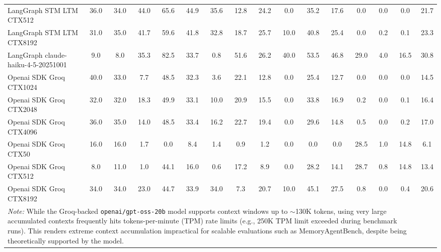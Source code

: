 \begin{table}[t]
\begin{tabular}{
    l|
    *{5}{c}|  %
    *{3}{c}|  %
    *{3}{c}|  %
    *{3}{c}|  %
    c         %
}
LangGraph STM LTM CTX512 & 36.0 & 34.0 & 44.0 & 65.6 & 44.9 & 35.6 & 12.8 & 24.2 & 0.0 & 35.2 & 17.6 & 0.0 & 0.0 & 0.0 & 21.7 \\
LangGraph STM LTM CTX8192 & 31.0 & 35.0 & 41.7 & 59.6 & 41.8 & 32.8 & 18.7 & 25.7 & 10.0 & 40.8 & 25.4 & 0.0 & 0.2 & 0.1 & 23.3 \\
LangGraph claude-haiku-4-5-20251001 & 9.0 & 8.0 & 35.3 & 82.5 & 33.7 & 0.8 & 51.6 & 26.2 & 40.0 & 53.5 & 46.8 & 29.0 & 4.0 & 16.5 & 30.8 \\
Openai SDK Groq CTX1024 & 40.0 & 33.0 & 7.7 & 48.5 & 32.3 & 3.6 & 22.1 & 12.8 & 0.0 & 25.4 & 12.7 & 0.0 & 0.0 & 0.0 & 14.5 \\
Openai SDK Groq CTX2048 & 32.0 & 32.0 & 18.3 & 49.9 & 33.1 & 10.0 & 20.9 & 15.5 & 0.0 & 33.8 & 16.9 & 0.2 & 0.0 & 0.1 & 16.4 \\
Openai SDK Groq CTX4096 & 36.0 & 35.0 & 14.0 & 48.5 & 33.4 & 16.2 & 22.7 & 19.4 & 0.0 & 29.6 & 14.8 & 0.5 & 0.0 & 0.2 & 17.0 \\
Openai SDK Groq CTX50 & 16.0 & 16.0 & 1.7 & 0.0 & 8.4 & 1.4 & 0.9 & 1.2 & 0.0 & 0.0 & 0.0 & 28.5 & 1.0 & 14.8 & 6.1 \\
Openai SDK Groq CTX512 & 8.0 & 11.0 & 1.0 & 44.1 & 16.0 & 0.6 & 17.2 & 8.9 & 0.0 & 28.2 & 14.1 & 28.7 & 0.8 & 14.8 & 13.4 \\
Openai SDK Groq CTX8192 & 34.0 & 34.0 & 23.0 & 44.7 & 33.9 & 34.0 & 7.3 & 20.7 & 10.0 & 45.1 & 27.5 & 0.8 & 0.0 & 0.4 & 20.6 \\


\midrule
\multicolumn{15}{p{0.95\linewidth}}{
\footnotesize\textit{Note:} While the Groq-backed \texttt{openai/gpt-oss-20b} model supports context windows up to $\sim$130K tokens, using very large accumulated contexts frequently hits tokens-per-minute (TPM) rate limits (e.g., 250K TPM limit exceeded during benchmark runs). This renders extreme context accumulation impractical for scalable evaluations such as MemoryAgentBench, despite being theoretically supported by the model.
}
\bottomrule
\end{tabular}
\end{table}